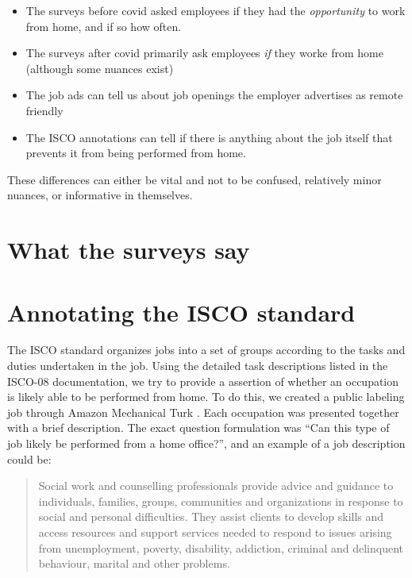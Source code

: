 \documentclass[11pt,]{article}
\providecommand{\tightlist}{%
\setlength{\itemsep}{0pt}\setlength{\parskip}{0pt}}
\begin{document}
\begin{itemize}
\tightlist
\item
  The surveys before covid asked employees if they had the
  \emph{opportunity} to work from home, and if so how often.
\item
  The surveys after covid primarily ask employees \emph{if} they worke
  from home (although some nuances exist)
\item
  The job ads can tell us about job openings the employer advertises as
  remote friendly
\item
  The ISCO annotations can tell if there is anything about the job
  itself that prevents it from being performed from home.
\end{itemize}

These differences can either be vital and not to be confused, relatively
minor nuances, or informative in themselves.

\hypertarget{what-the-surveys-say}{%
\section{What the surveys say}\label{what-the-surveys-say}}

\hypertarget{annotating-the-isco-standard}{%
\section{Annotating the ISCO
standard}\label{annotating-the-isco-standard}}

The ISCO standard organizes jobs into a set of groups according to the
tasks and duties undertaken in the job. Using the detailed task
descriptions listed in the ISCO-08 documentation, we try to provide a
assertion of whether an occupation is likely able to be performed from
home. To do this, we created a public labeling job through Amazon
Mechanical Turk \citep{Turk2020}. Each occupation was presented together
with a brief description. The exact question formulation was ``Can this
type of job likely be performed from a home office?'', and an example of
a job description could be:

\begin{quote}
Social work and counselling professionals provide advice and guidance to
individuals, families, groups, communities and organizations in response
to social and personal difficulties. They assist clients to develop
skills and access resources and support services needed to respond to
issues arising from unemployment, poverty, disability, addiction,
criminal and delinquent behaviour, marital and other problems.
\end{quote}
\end{document}
